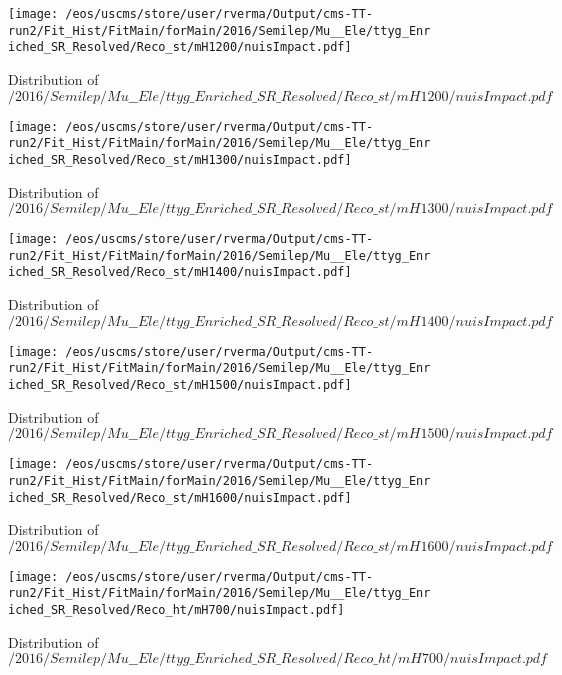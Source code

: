 \begin{figure}
\centering
\texttt{[image: /eos/uscms/store/user/rverma/Output/cms-TT-run2/Fit\_Hist/FitMain/forMain/2016/Semilep/Mu\_\_Ele/ttyg\_Enriched\_SR\_Resolved/Reco\_st/mH1200/nuisImpact.pdf]}
\caption{Distribution of $/2016/Semilep/Mu\_\_Ele/ttyg\_Enriched\_SR\_Resolved/Reco\_st/mH1200/nuisImpact.pdf$}
\end{figure}

\begin{figure}
\centering
\texttt{[image: /eos/uscms/store/user/rverma/Output/cms-TT-run2/Fit\_Hist/FitMain/forMain/2016/Semilep/Mu\_\_Ele/ttyg\_Enriched\_SR\_Resolved/Reco\_st/mH1300/nuisImpact.pdf]}
\caption{Distribution of $/2016/Semilep/Mu\_\_Ele/ttyg\_Enriched\_SR\_Resolved/Reco\_st/mH1300/nuisImpact.pdf$}
\end{figure}

\begin{figure}
\centering
\texttt{[image: /eos/uscms/store/user/rverma/Output/cms-TT-run2/Fit\_Hist/FitMain/forMain/2016/Semilep/Mu\_\_Ele/ttyg\_Enriched\_SR\_Resolved/Reco\_st/mH1400/nuisImpact.pdf]}
\caption{Distribution of $/2016/Semilep/Mu\_\_Ele/ttyg\_Enriched\_SR\_Resolved/Reco\_st/mH1400/nuisImpact.pdf$}
\end{figure}

\begin{figure}
\centering
\texttt{[image: /eos/uscms/store/user/rverma/Output/cms-TT-run2/Fit\_Hist/FitMain/forMain/2016/Semilep/Mu\_\_Ele/ttyg\_Enriched\_SR\_Resolved/Reco\_st/mH1500/nuisImpact.pdf]}
\caption{Distribution of $/2016/Semilep/Mu\_\_Ele/ttyg\_Enriched\_SR\_Resolved/Reco\_st/mH1500/nuisImpact.pdf$}
\end{figure}

\begin{figure}
\centering
\texttt{[image: /eos/uscms/store/user/rverma/Output/cms-TT-run2/Fit\_Hist/FitMain/forMain/2016/Semilep/Mu\_\_Ele/ttyg\_Enriched\_SR\_Resolved/Reco\_st/mH1600/nuisImpact.pdf]}
\caption{Distribution of $/2016/Semilep/Mu\_\_Ele/ttyg\_Enriched\_SR\_Resolved/Reco\_st/mH1600/nuisImpact.pdf$}
\end{figure}

\begin{figure}
\centering
\texttt{[image: /eos/uscms/store/user/rverma/Output/cms-TT-run2/Fit\_Hist/FitMain/forMain/2016/Semilep/Mu\_\_Ele/ttyg\_Enriched\_SR\_Resolved/Reco\_ht/mH700/nuisImpact.pdf]}
\caption{Distribution of $/2016/Semilep/Mu\_\_Ele/ttyg\_Enriched\_SR\_Resolved/Reco\_ht/mH700/nuisImpact.pdf$}
\end{figure}

